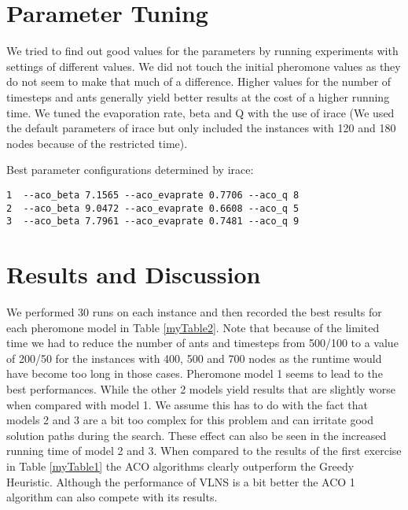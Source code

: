 \documentclass[a4paper]{scrartcl}
\begin{document}
\section{Parameter Tuning}
We tried to find out good values for the parameters by running experiments with settings of different values. We did not touch the initial pheromone values as they do not seem to make that much of a difference. Higher values for the number of timesteps and ants generally yield better results at the cost of a higher running time.
We tuned the evaporation rate, beta and Q with the use of irace \cite{lopez2011irace} (We used the default parameters of irace but only included the instances with 120 and 180 nodes because of the restricted time).

Best parameter configurations determined by irace:

\begin{verbatim}
1  --aco_beta 7.1565 --aco_evaprate 0.7706 --aco_q 8
2  --aco_beta 9.0472 --aco_evaprate 0.6608 --aco_q 5
3  --aco_beta 7.7961 --aco_evaprate 0.7481 --aco_q 9
\end{verbatim}

\section{Results and Discussion}

We performed 30 runs on each instance and then recorded the best results for each pheromone model in Table \ref{myTable2}. Note that because of the limited time we had to reduce the number of ants and timesteps from 500/100 to a value of 200/50 for the instances with 400, 500 and 700 nodes as the runtime would have become too long in those cases. Pheromone model 1 seems to lead to the best performances. While the other 2 models yield results that are slightly worse when compared with model 1. We assume this has to do with the fact that models 2 and 3 are a bit too complex for this problem and can irritate good solution paths during the search. These effect can also be seen in the increased running time of model 2 and 3.
When compared to the results of the first exercise in Table \ref{myTable1} the ACO algorithms clearly outperform the Greedy Heuristic. Although the performance of VLNS is a bit better the ACO 1 algorithm can also compete with its results.
\end{document}
